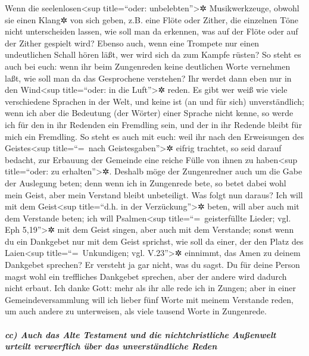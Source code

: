  Wenn die seelenlosen\textless sup title=``oder:
unbelebten''\textgreater✲ Musikwerkzeuge, obwohl sie einen Klang✲ von
sich geben, z.B. eine Flöte oder Zither, die einzelnen Töne nicht
unterscheiden lassen, wie soll man da erkennen, was auf der Flöte oder
auf der Zither gespielt wird?  Ebenso auch, wenn eine
Trompete nur einen undeutlichen Schall hören läßt, wer wird sich da zum
Kampfe rüsten?  So steht es auch bei euch: wenn ihr beim
Zungenreden keine deutlichen Worte vernehmen laßt, wie soll man da das
Gesprochene verstehen? Ihr werdet dann eben nur in den Wind\textless sup
title=``oder: in die Luft''\textgreater✲ reden.  Es gibt
wer weiß wie viele verschiedene Sprachen in der Welt, und keine ist (an
und für sich) unverständlich;  wenn ich aber die
Bedeutung (der Wörter) einer Sprache nicht kenne, so werde ich für den
in ihr Redenden ein Fremdling sein, und der in ihr Redende bleibt für
mich ein Fremdling.  So steht es auch mit euch: weil ihr
nach den Erweisungen des Geistes\textless sup title=``=~nach
Geistesgaben''\textgreater✲ eifrig trachtet, so seid darauf bedacht, zur
Erbauung der Gemeinde eine reiche Fülle von ihnen zu haben\textless sup
title=``oder: zu erhalten''\textgreater✲.  Deshalb möge
der Zungenredner auch um die Gabe der Auslegung beten; 
denn wenn ich in Zungenrede bete, so betet dabei wohl mein Geist, aber
mein Verstand bleibt unbeteiligt.  Was folgt nun daraus?
Ich will mit dem Geist\textless sup title=``d.h. in der
Verzückung''\textgreater✲ beten, will aber auch mit dem Verstande beten;
ich will Psalmen\textless sup title=``=~geisterfüllte Lieder; vgl. Eph
5,19''\textgreater✲ mit dem Geist singen, aber auch mit dem Verstande;
 sonst wenn du ein Dankgebet nur mit dem Geist sprichst,
wie soll da einer, der den Platz des Laien\textless sup
title=``=~Unkundigen; vgl. V.23''\textgreater✲ einnimmt, das Amen zu
deinem Dankgebet sprechen? Er versteht ja gar nicht, was du sagst.
 Du für deine Person magst wohl ein treffliches Dankgebet
sprechen, aber der andere wird dadurch nicht erbaut.  Ich
danke Gott: mehr als ihr alle rede ich in Zungen;  aber
in einer Gemeindeversammlung will ich lieber fünf Worte mit meinem
Verstande reden, um auch andere zu unterweisen, als viele tausend Worte
in Zungenrede.

\hypertarget{cc-auch-das-alte-testament-und-die-nichtchristliche-auuxdfenwelt-urteilt-verwerflich-uxfcber-das-unverstuxe4ndliche-reden}{%
\subparagraph{cc) Auch das Alte Testament und die nichtchristliche
Außenwelt urteilt verwerflich über das unverständliche
Reden}\label{cc-auch-das-alte-testament-und-die-nichtchristliche-auuxdfenwelt-urteilt-verwerflich-uxfcber-das-unverstuxe4ndliche-reden}}

